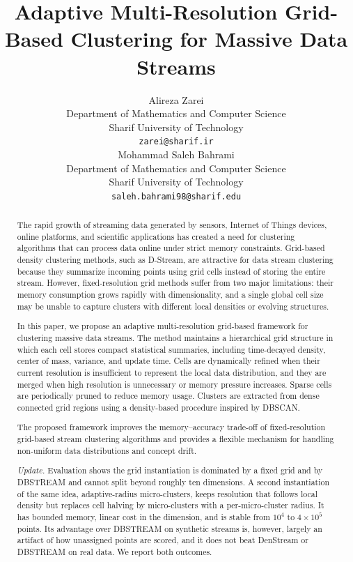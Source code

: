\documentclass[11pt]{article}
\title{
Adaptive Multi-Resolution Grid-Based Clustering for Massive Data Streams
}
\author{
Alireza Zarei \\
Department of Mathematics and Computer Science \\
Sharif University of Technology \\
\texttt{zarei@sharif.ir}
\\
Mohammad Saleh Bahrami \\
Department of Mathematics and Computer Science \\
Sharif University of Technology \\
\texttt{saleh.bahrami98@sharif.edu}
}
\date{}
\begin{document}
\maketitle

\begin{abstract}
The rapid growth of streaming data generated by sensors, Internet of Things devices, online platforms, and scientific applications has created a need for clustering algorithms that can process data online under strict memory constraints. Grid-based density clustering methods, such as D-Stream, are attractive for data stream clustering because they summarize incoming points using grid cells instead of storing the entire stream. However, fixed-resolution grid methods suffer from two major limitations: their memory consumption grows rapidly with dimensionality, and a single global cell size may be unable to capture clusters with different local densities or evolving structures.

In this paper, we propose an adaptive multi-resolution grid-based framework for clustering massive data streams. The method maintains a hierarchical grid structure in which each cell stores compact statistical summaries, including time-decayed density, center of mass, variance, and update time. Cells are dynamically refined when their current resolution is insufficient to represent the local data distribution, and they are merged when high resolution is unnecessary or memory pressure increases. Sparse cells are periodically pruned to reduce memory usage. Clusters are extracted from dense connected grid regions using a density-based procedure inspired by DBSCAN.

The proposed framework improves the memory--accuracy trade-off of fixed-resolution grid-based stream clustering algorithms and provides a flexible mechanism for handling non-uniform data distributions and concept drift.

\emph{Update.} Evaluation shows the grid instantiation is dominated by a fixed grid and by DBSTREAM and cannot split beyond roughly ten dimensions. A second instantiation of the same idea, adaptive-radius micro-clusters, keeps resolution that follows local density but replaces cell halving by micro-clusters with a per-micro-cluster radius. It has bounded memory, linear cost in the dimension, and is stable from $10^4$ to $4\times10^5$ points. Its advantage over DBSTREAM on synthetic streams is, however, largely an artifact of how unassigned points are scored, and it does not beat DenStream or DBSTREAM on real data. We report both outcomes.
\end{abstract}
\end{document}
